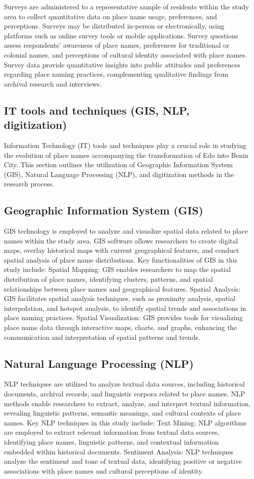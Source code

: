 Surveys are administered to a representative sample of residents within the study area to collect quantitative data on place name usage, preferences, and perceptions. Surveys may be distributed in-person or electronically, using platforms such as online survey tools or mobile applications. Survey questions assess respondents' awareness of place names, preferences for traditional or colonial names, and perceptions of cultural identity associated with place names. Survey data provide quantitative insights into public attitudes and preferences regarding place naming practices, complementing qualitative findings from archival research and interviews.
\subsection{IT tools and techniques (GIS, NLP, digitization)}
Information Technology (IT) tools and techniques play a crucial role in studying the evolution of place names accompanying the transformation of Edo into Benin City. This section outlines the utilization of Geographic Information System (GIS), Natural Language Processing (NLP), and digitization methods in the research process.
\subsection*{Geographic Information System (GIS)}
GIS technology is employed to analyze and visualize spatial data related to place names within the study area. GIS software allows researchers to create digital maps, overlay historical maps with current geographical features, and conduct spatial analysis of place name distributions. Key functionalities of GIS in this study include:
Spatial Mapping: GIS enables researchers to map the spatial distribution of place names, identifying clusters, patterns, and spatial relationships between place names and geographical features.
Spatial Analysis: GIS facilitates spatial analysis techniques, such as proximity analysis, spatial interpolation, and hotspot analysis, to identify spatial trends and associations in place naming practices.
Spatial Visualization: GIS provides tools for visualizing place name data through interactive maps, charts, and graphs, enhancing the communication and interpretation of spatial patterns and trends.
\subsection*{Natural Language Processing (NLP)}
NLP techniques are utilized to analyze textual data sources, including historical documents, archival records, and linguistic corpora related to place names. NLP methods enable researchers to extract, analyze, and interpret textual information, revealing linguistic patterns, semantic meanings, and cultural contexts of place names. Key NLP techniques in this study include:
Text Mining: NLP algorithms are employed to extract relevant information from textual data sources, identifying place names, linguistic patterns, and contextual information embedded within historical documents.
Sentiment Analysis: NLP techniques analyze the sentiment and tone of textual data, identifying positive or negative associations with place names and cultural perceptions of identity.

